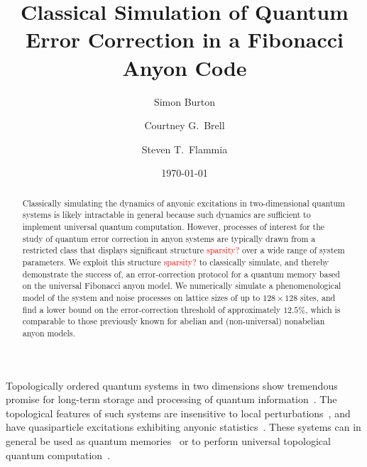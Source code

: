 \documentclass[aps, prl, letterpaper, twocolumn, superscriptaddress, notitlepage, 10pt]{revtex4-1}
\newcommand{\dude}[1]{\textcolor{red}{#1}}
\begin{document}
\title{Classical Simulation of Quantum Error Correction in a Fibonacci Anyon Code}

\author{Simon Burton}
\author{Courtney G.\ Brell}
\author{Steven T.\ Flammia}

\date{\today}

\begin{abstract}
Classically simulating the dynamics of anyonic excitations in two-dimensional quantum systems is likely intractable in general because such dynamics are sufficient to implement 
universal quantum computation. However, processes of interest for the study of quantum 
error correction in anyon systems are typically drawn from a restricted class that displays 
significant structure \dude{sparsity?} over a wide range of system parameters.
We exploit this structure \dude{sparsity?} to classically simulate, and thereby demonstrate the success of, an 
error-correction protocol for a quantum memory based on the universal Fibonacci anyon 
model.  We numerically simulate a phenomenological model of the system and noise 
processes on lattice sizes of up to 
$128\times128$ sites, and find a lower bound on the error-correction threshold of 
approximately $12.5\%$, which is comparable to those previously known for abelian and 
(non-universal) nonabelian anyon models.
\end{abstract}

\maketitle


Topologically ordered quantum systems in two dimensions show tremendous promise for 
long-term storage and processing of quantum information~\cite{Kitaev2003, Dennis2002, Nayak2008}. 
The topological features of such systems are insensitive to local 
perturbations~\cite{Bravyi2010, Bravyi2011a, Michalakis2013}, and have quasiparticle excitations 
exhibiting anyonic statistics~\cite{Wilczek1990}. These systems can in general be used as 
quantum memories~\cite{Kitaev2003, Dennis2002} or to perform universal topological 
quantum computation~\cite{Freedman2002, Nayak2008}.
\end{document}
